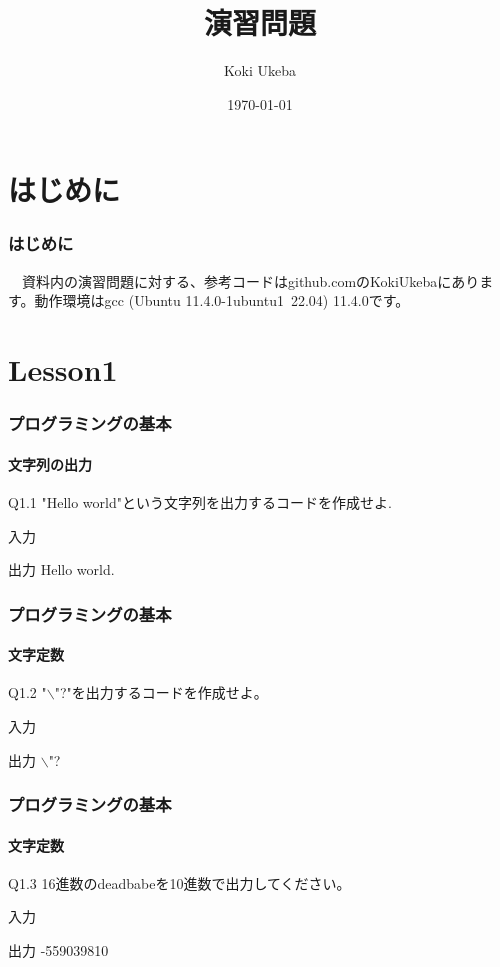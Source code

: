 \documentclass[dvipdfmx]{beamer}
\title{演習問題}
\author{Koki Ukeba}
\date{\today}
\begin{document}
\maketitle

\section{はじめに}
\begin{frame}
	\frametitle{はじめに}
	　資料内の演習問題に対する、参考コードはgithub.comのKokiUkebaにあります。動作環境はgcc (Ubuntu 11.4.0-1ubuntu1~22.04) 11.4.0です。
\end{frame}

\begin{frame}[allowframebreaks]
    \tableofcontents
\end{frame}

\section{Lesson1}
\begin{frame}
	\frametitle{プログラミングの基本}
    \framesubtitle{文字列の出力}
	\begin{itembox}[l]{Q1.1}
		"Hello world"という文字列を出力するコードを作成せよ.
	\end{itembox}
	\begin{block}{入力}
	\end{block}
	\begin{block}{出力}
		Hello world.
	\end{block}
\end{frame}

\begin{frame}
    \frametitle{プログラミングの基本}
    \framesubtitle{文字定数}
	\begin{itembox}[l]{Q1.2}
		"$\backslash$"?"を出力するコードを作成せよ。
	\end{itembox}
	\begin{block}{入力}
	\end{block}
	\begin{block}{出力}
        $\backslash$"?
	\end{block}
\end{frame}

\begin{frame}
    \frametitle{プログラミングの基本}
    \framesubtitle{文字定数}
	\begin{itembox}[l]{Q1.3}
        16進数のdeadbabeを10進数で出力してください。
	\end{itembox}
	\begin{block}{入力}
	\end{block}
	\begin{block}{出力}
        -559039810
	\end{block}
\end{frame}
\end{document}
